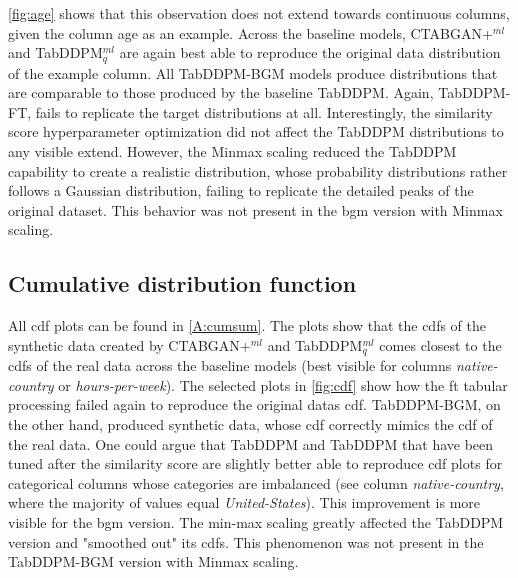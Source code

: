 \autoref{fig:age} shows that this observation does not extend towards continuous columns, given the column age as an example.
Across the baseline models, CTABGAN+$^{ml}$ and TabDDPM$^{ml}_q$ are again best able to reproduce the original data distribution of the example column.
All TabDDPM-BGM models produce distributions that are comparable to those produced by the baseline TabDDPM.
Again, TabDDPM-FT, fails to replicate the target distributions at all.
Interestingly, the similarity score hyperparameter optimization did not affect the TabDDPM distributions to any visible extend.
However, the Minmax scaling reduced the TabDDPM capability to create a realistic distribution, whose probability distributions rather follows a Gaussian distribution, failing to replicate the detailed peaks of the original dataset.
This behavior was not present in the \gls{bgm} version with Minmax scaling.


\subsection{Cumulative distribution function}
All \gls{cdf} plots can be found in \autoref{A:cumsum}.
The plots show that the \glspl{cdf} of the synthetic data created by CTABGAN+$^{ml}$ and TabDDPM$^{ml}_q$ comes closest to
the \glspl{cdf} of the real data across the baseline models (best visible for columns \textit{native-country} or \textit{hours-per-week}).
The selected plots in \autoref{fig:cdf} show how the \gls{ft} tabular processing failed again to reproduce the original datas \gls{cdf}.
TabDDPM-BGM, on the other hand, produced synthetic data, whose \gls{cdf} correctly mimics the \gls{cdf} of the real data.
One could argue that TabDDPM and TabDDPM that have been tuned after the similarity score are slightly better able to
reproduce \gls{cdf} plots for categorical columns whose categories are imbalanced (\eg see column \textit{native-country}, where the majority of values equal \textit{United-States}).
This improvement is more visible for the \gls{bgm} version.
The min-max scaling greatly affected the TabDDPM version and "smoothed out" its \glspl{cdf}.
This phenomenon was not present in the TabDDPM-BGM version with Minmax scaling.

